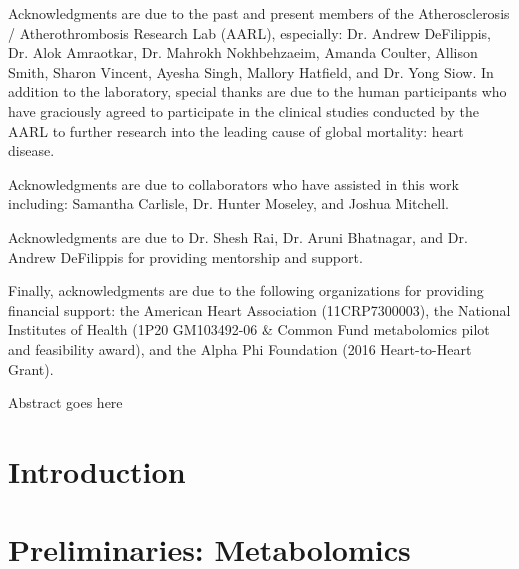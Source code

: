 \documentclass[final]{ulthesis}
\begin{document}
\begin{acknowledgments}
Acknowledgments are due to the past and present members of the Atherosclerosis / Atherothrombosis Research Lab (AARL), especially: Dr. Andrew DeFilippis, Dr. Alok Amraotkar, Dr. Mahrokh Nokhbehzaeim, Amanda Coulter, Allison Smith, Sharon Vincent, Ayesha Singh, Mallory Hatfield, and Dr. Yong Siow. In addition to the laboratory, special thanks are due to the human participants who have graciously agreed to participate in the clinical studies conducted by the AARL to further research into the leading cause of global mortality: heart disease.

Acknowledgments are due to collaborators who have assisted in this work including: Samantha Carlisle, Dr. Hunter Moseley, and Joshua Mitchell.

Acknowledgments are due to Dr. Shesh Rai, Dr. Aruni Bhatnagar, and Dr. Andrew DeFilippis for providing mentorship and support. 

Finally, acknowledgments are due to the following organizations for providing financial support: the American Heart Association (11CRP7300003), the National Institutes of Health
(1P20 GM103492-06 \& Common Fund metabolomics pilot and feasibility award), and the Alpha Phi Foundation (2016 Heart-to-Heart Grant).
\end{acknowledgments}

\begin{dissertationabstract}
Abstract goes here
\end{dissertationabstract}

\tableofcontents \clearpage
\listoftables \clearpage
\listoffigures \clearpage

\mainmatter


\chapter{Introduction}


\chapter{Preliminaries: Metabolomics}

\end{document}
